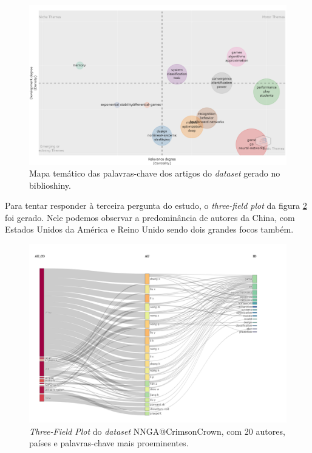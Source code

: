 \begin{figure}
    \centering
    \includegraphics[angle=0,width=1\textwidth,height=0.5\textheight]{experiments/CrimsonCrown/AnaliseBibliometrica/RedesNeuraisJogos/NNGAThematicMap.png}
    \caption{Mapa temático das palavras-chave dos artigos do \textit{dataset} gerado no biblioshiny.}
    \label{fig:CrimsonCrown:NNGA:ThematicMap}
\end{figure}

Para tentar responder à terceira pergunta do estudo, o \textit{three-field plot} da figura \ref{fig:CrimsonCrown:NNGA:TFP} foi gerado. Nele podemos observar a predominância de autores da China, com Estados Unidos da América e Reino Unido sendo dois grandes focos também.  

\begin{figure}
    \centering
    \includegraphics[angle=0,width=1\textwidth,height=0.5\textheight]{experiments/CrimsonCrown/AnaliseBibliometrica/RedesNeuraisJogos/NNGASankeyAuCoKW.png}
    \caption{\textit{Three-Field Plot} do \textit{dataset} NNGA@CrimsonCrown, com 20 autores, países e palavras-chave mais proeminentes.}
    \label{fig:CrimsonCrown:NNGA:TFP}
\end{figure}